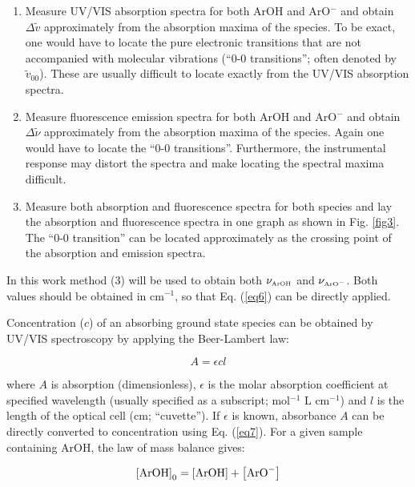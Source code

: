 \documentclass[byrevtex,amssymb,aps,pra,floatfix,letterpaper]{revtex4}
\begin{document}
\begin{enumerate}

\item Measure UV/VIS absorption spectra for both ArOH and ArO$^-$ and obtain $\Delta\tilde{v}$ approximately from the absorption maxima of the species. To be exact, one would have to locate the pure electronic transitions that are not accompanied with molecular vibrations (``0-0 transitions''; often denoted by $\tilde{v}_{00}$). These are usually difficult to locate exactly from the UV/VIS absorption spectra.

\item Measure fluorescence emission spectra for both ArOH and ArO$^-$ and obtain $\Delta\tilde{\nu}$ approximately from the absorption maxima of the species. Again one would have to locate the ``0-0 transitions''. Furthermore, the instrumental response may distort the spectra and make locating the spectral maxima difficult.

\item Measure both absorption and fluorescence spectra for both species and lay the absorption and fluorescence spectra in one graph as shown in Fig. \ref{fig3}. The ``0-0 transition'' can be located approximately as the crossing point of the absorption and emission spectra.
\end{enumerate}

\noindent
In this work method (3) will be used to obtain both $\nu_\textnormal{\tiny ArOH}$ and $\nu_{\textnormal{\tiny ArO}^-}$. Both values should be obtained in cm$^{-1}$, so that Eq. (\ref{eq6}) can be directly applied.

Concentration ($c$) of an absorbing ground state species can be obtained by UV/VIS spectroscopy by applying the Beer-Lambert law:

\begin{equation}
\label{eq7}
A = \epsilon cl
\end{equation}

\noindent
where $A$ is absorption (dimensionless), $\epsilon$ is the molar absorption coefficient at specified wavelength (usually specified as a subscript; mol$^{-1}$ L cm$^{-1}$) and $l$ is the length of the optical cell (cm; ``cuvette''). If $\epsilon$ is known, absorbance $A$ can be directly converted to concentration using Eq. (\ref{eq7}). For a given sample containing ArOH, the law of mass balance gives:

\begin{equation}
\label{eq8}
\left[\textnormal{ArOH}\right]_0 = \left[\textnormal{ArOH}\right] + \left[\textnormal{ArO}^-\right]
\end{equation}
\end{document}
